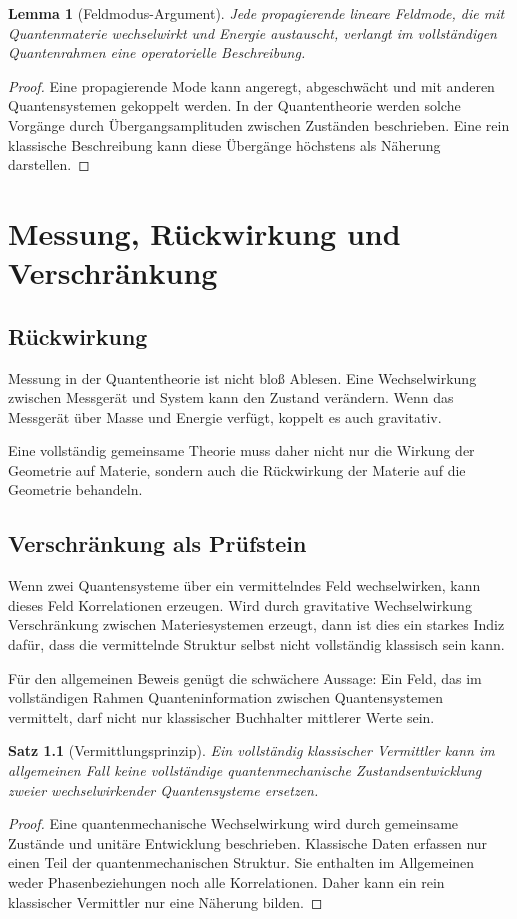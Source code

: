 \documentclass[11pt,a4paper,openany]{book}
\newtheorem{satz}{Satz}[chapter]
\newtheorem{lemma}{Lemma}[chapter]
\theoremstyle{remark}
\begin{document}
\begin{lemma}[Feldmodus-Argument]
Jede propagierende lineare Feldmode, die mit Quantenmaterie wechselwirkt und Energie austauscht, verlangt im vollständigen Quantenrahmen eine operatorielle Beschreibung.
\end{lemma}
\begin{proof}
Eine propagierende Mode kann angeregt, abgeschwächt und mit anderen Quantensystemen gekoppelt werden. In der Quantentheorie werden solche Vorgänge durch Übergangsamplituden zwischen Zuständen beschrieben. Eine rein klassische Beschreibung kann diese Übergänge höchstens als Näherung darstellen.
\end{proof}

\chapter{Messung, Rückwirkung und Verschränkung}
\section{Rückwirkung}
Messung in der Quantentheorie ist nicht bloß Ablesen. Eine Wechselwirkung zwischen Messgerät und System kann den Zustand verändern. Wenn das Messgerät über Masse und Energie verfügt, koppelt es auch gravitativ.

Eine vollständig gemeinsame Theorie muss daher nicht nur die Wirkung der Geometrie auf Materie, sondern auch die Rückwirkung der Materie auf die Geometrie behandeln.

\section{Verschränkung als Prüfstein}
Wenn zwei Quantensysteme über ein vermittelndes Feld wechselwirken, kann dieses Feld Korrelationen erzeugen. Wird durch gravitative Wechselwirkung Verschränkung zwischen Materiesystemen erzeugt, dann ist dies ein starkes Indiz dafür, dass die vermittelnde Struktur selbst nicht vollständig klassisch sein kann.

Für den allgemeinen Beweis genügt die schwächere Aussage: Ein Feld, das im vollständigen Rahmen Quanteninformation zwischen Quantensystemen vermittelt, darf nicht nur klassischer Buchhalter mittlerer Werte sein.

\begin{satz}[Vermittlungsprinzip]
Ein vollständig klassischer Vermittler kann im allgemeinen Fall keine vollständige quantenmechanische Zustandsentwicklung zweier wechselwirkender Quantensysteme ersetzen.
\end{satz}
\begin{proof}
Eine quantenmechanische Wechselwirkung wird durch gemeinsame Zustände und unitäre Entwicklung beschrieben. Klassische Daten erfassen nur einen Teil der quantenmechanischen Struktur. Sie enthalten im Allgemeinen weder Phasenbeziehungen noch alle Korrelationen. Daher kann ein rein klassischer Vermittler nur eine Näherung bilden.
\end{proof}
\end{document}
